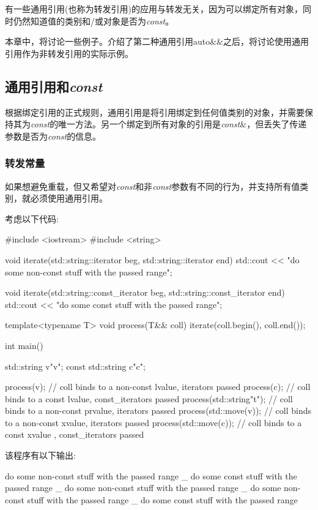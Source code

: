 有一些通用引用(也称为转发引用)的应用与转发无关，因为可以绑定所有对象，同时仍然知道值的类别和/或对象是否为\textit{const}。

本章中，将讨论一些例子。介绍了第二种通用引用auto\&\&之后，将讨论使用通用引用作为非转发引用的实际示例。

\subsection{通用引用和\textit{const}}

根据绑定引用的正式规则，通用引用是将引用绑定到任何值类别的对象，并需要保持其为\textit{const}的唯一方法。另一个绑定到所有对象的引用是\textit{const}\&，但丢失了传递参数是否为\textit{const}的信息。

\subsubsection{转发常量}

如果想避免重载，但又希望对\textit{const}和非\textit{const}参数有不同的行为，并支持所有值类别，就必须使用通用引用。

考虑以下代码:

\begin{cppcode}
#include <iostream>
#include <string>

void iterate(std::string::iterator beg, std::string::iterator end)
{
	std::cout << "do some non-const stuff with the passed range\n";
}

void iterate(std::string::const_iterator beg, std::string::const_iterator end)
{
	std::cout << "do some const stuff with the passed range\n";
}

template<typename T>
void process(T&& coll)
{
	iterate(coll.begin(), coll.end());
}

int main()
{
	std::string v{"v"};
	const std::string c{"c"};
	
	process(v); // coll binds to a non-const lvalue, iterators passed
	process(c); // coll binds to a const lvalue, const_iterators passed
	process(std::string{"t"}); // coll binds to a non-const prvalue, iterators passed
	process(std::move(v)); // coll binds to a non-const xvalue, iterators passed
	process(std::move(c)); // coll binds to a const xvalue , const_iterators passed
}
\end{cppcode}

该程序有以下输出:

\begin{shell}
do some non-const stuff with the passed range _
do some const stuff with the passed range _
do some non-const stuff with the passed range _
do some non-const stuff with the passed range _
do some const stuff with the passed range
\end{shell}

